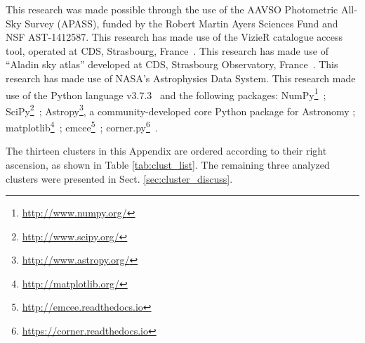 \documentclass[draft]{aa}
\begin{document}
\begin{acknowledgements}
%
This research was made possible through the use of the AAVSO Photometric
All-Sky Survey (APASS), funded by the Robert Martin Ayers Sciences Fund and NSF
AST-1412587.
%
This research has made use of the VizieR catalogue access tool, operated at CDS,
Strasbourg, France~\citep{Ochsenbein_2000}.
%
This research has made use of ``Aladin sky atlas'' developed at
CDS, Strasbourg Observatory, France~\citep{Bonnarel2000,Boch2014}.
%
This research has made use of NASA's Astrophysics Data System.
%
This research made use of the Python language v3.7.3~\citep{vanRossum_1995}
and the following packages:
NumPy\footnote{\url{http://www.numpy.org/}}~\citep{vanDerWalt_2011};
SciPy\footnote{\url{http://www.scipy.org/}}~\citep{Jones_2001};
Astropy\footnote{\url{http://www.astropy.org/}}, a community-developed core
Python package for Astronomy \citep{Astropy_2013};
matplotlib\footnote{\url{http://matplotlib.org/}}~\citep{hunter_2007};
emcee\footnote{\url{http://emcee.readthedocs.io}}~\citep{emcee};
corner.py\footnote{\url{https://corner.readthedocs.io}}~\citep{corner}.
\end{acknowledgements}





















































\appendix

The thirteen clusters in this Appendix are ordered according to their right
ascension, as shown in Table \ref{tab:clust_list}. The remaining three analyzed
clusters were presented in Sect. \ref{sec:cluster_discuss}.
\end{document}
